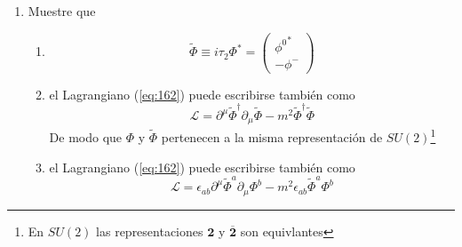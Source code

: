 \begin{enumerate}
\item Muestre que 
  \label{item:pch3.3} %
  \begin{enumerate} %
  \item 
    \begin{equation}
      \tilde \Phi\equiv i\tau_2\Phi^*=\begin{pmatrix}
        {\phi^0}^*\\
        -\phi^-
      \end{pmatrix}
    \end{equation}
  \item el Lagrangiano (\ref{eq:162}) puede escribirse tambi\'en como
     \begin{equation}
       \mathcal{L}=\partial^\mu\tilde \Phi^\dagger\partial_\mu\tilde\Phi-m^2\tilde \Phi^\dagger\tilde\Phi
     \end{equation}
     De modo que $\Phi$ y $\tilde\Phi$ pertenecen a la misma representaci\'on de $SU(2)$\footnote{En $SU(2)$ las representaciones $\mathbf{2}$ y $\overline{\mathbf{2}}$ son equivlantes}
   \item el Lagrangiano (\ref{eq:162}) puede escribirse tambi\'en como
     \begin{equation}
       \mathcal{L}=\epsilon_{ab}\partial^\mu\tilde \Phi^a\partial_\mu\Phi^b-m^2\epsilon_{ab}\tilde \Phi^a\Phi^b
     \end{equation}

   \end{enumerate} %


\end{enumerate}
